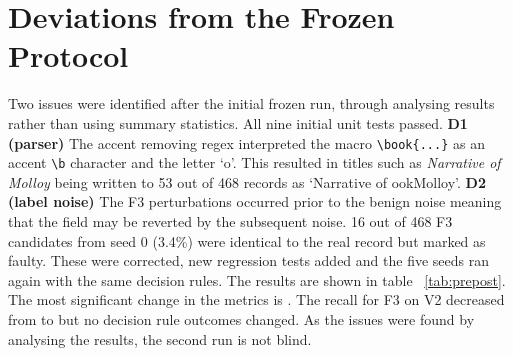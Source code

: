 \section{Deviations from the Frozen Protocol}\label{sec:deviations}
Two issues were identified after the initial frozen run, through analysing results rather than using summary statistics. All nine initial unit tests passed.
\textbf{D1 (parser)} The accent removing regex interpreted the macro \verb|\book{...}| as an accent \verb|\b| character and the letter `o'. This resulted in titles such as
\emph{Narrative of Molloy} being written to 53 out of 468 records as `Narrative of ookMolloy’. \textbf{D2 (label noise)} The F3 perturbations occurred prior to the benign noise meaning that
the field may be reverted by the subsequent noise. 16 out of 468 F3 candidates from seed 0 (3.4\%) were identical to the real record but marked as faulty. These were corrected, new regression
tests added and the five seeds ran again with the same decision rules. The results are shown in table ~\ref{tab:prepost}. The most significant change in the metrics is \NmaxDeltaFix{}.
The recall for F3 on V2 decreased from \NpreVtwoFthree{} to \NVtwoFthree{} but no decision rule outcomes changed. As the issues were found by analysing the results, the second run is not blind.

\begin{table}[t]
\caption{Effect of correcting defects D1 and D2 ($\rho_f{=}0.05$, complete index, mean over 5 seeds).}
\label{tab:prepost}
\centering\footnotesize

\end{table}

